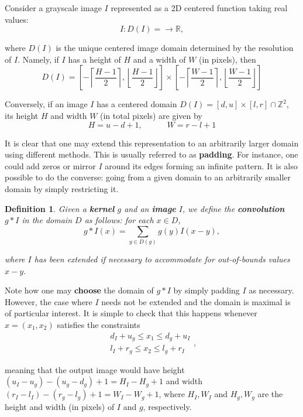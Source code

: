 \documentclass{article}
\newtheorem{definition}{Definition}
\begin{document}
Consider a grayscale image \(I\) represented as a 2D centered function taking real values:
\[
  I\colon D(I)=\to \mathbb{R}
,\]

where \(D(I)\) is the unique centered image domain determined by the resolution of \(I\). Namely, if \(I\) has a height of \(H\) and a width of \(W\) (in pixels), then
\begin{equation}\label{eq:domain-of-image}
  D(I) = \left[-\left\lceil\frac{H-1}{2}\right\rceil, \left\lfloor\frac{H-1}{2}\right\rfloor\right]\times\left[-\left\lceil\frac{W-1}{2}\right\rceil, \left\lfloor\frac{W-1}{2}\right\rfloor\right]
\end{equation}

Conversely, if an image \(I\) has a centered domain \(D(I)=[d, u]\times[l, r]\cap\mathbb{Z}^2\), its height \(H\) and width \(W\) (in total pixels) are given by
\begin{equation}\label{eq:dimensions-given-domain}
  H = u - d + 1, \text{~~~~~~~~~} W = r - l + 1
\end{equation}

It is clear that one may extend this representation to an arbitrarily larger domain using different methods. This is usually referred to as \textbf{padding}. For instance, one could add zeros or mirror \(I\) around its edges forming an infinite pattern. It is also possible to do the converse: going from a given domain to an arbitrarily smaller domain by simply restricting it.

\begin{definition}
Given a \textbf{kernel} \(g\) and an \textbf{image} \(I\), we define the \textbf{convolution} \(g\ast I\) in the domain \(D\) as follows: for each \(x\in D\),
\[
  g\ast I(x) = \sum_{y\in D(g)}g(y)I(x-y)
,\]

where \(I\) has been extended if necessary to accommodate for out-of-bounds values \(x-y\).
\end{definition}

Note how one may \textbf{choose} the domain of \(g\ast I\) by simply padding \(I\) as necessary. However, the case where \(I\) needs not be extended and the domain is maximal is of particular interest. It is simple to check that this happens whenever \(x=(x_1, x_2)\) satisfies the constraints
\[
\begin{align}
  d_I+u_g \leq x_1 \leq d_g + u_I\\
  l_I+r_g \leq x_2 \leq l_g + r_I
\end{align}
,\]

meaning that the output image would have height \((u_I-u_g)-(u_g-d_g) +1 = H_I - H_g + 1\) and width \((r_I-l_I) - (r_g - l_g) + 1 = W_I - W_g + 1\), where \(H_I, W_I\) and \(H_g, W_g\) are the height and width (in pixels) of \(I\) and \(g\), respectively.
\end{document}
